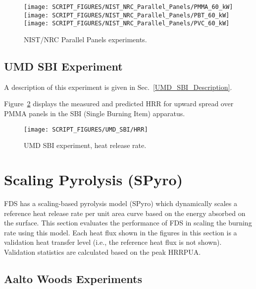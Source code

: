 \begin{figure}[!ht]
\centering
\texttt{[image: SCRIPT\_FIGURES/NIST\_NRC\_Parallel\_Panels/PMMA\_60\_kW]} \\
\texttt{[image: SCRIPT\_FIGURES/NIST\_NRC\_Parallel\_Panels/PBT\_60\_kW]} \\
\texttt{[image: SCRIPT\_FIGURES/NIST\_NRC\_Parallel\_Panels/PVC\_60\_kW]}
\caption[NIST/NRC Parallel Panels experiments]{NIST/NRC Parallel Panels experiments.}
\label{NIST_NRC_PP_HRR}
\end{figure}


\clearpage

\subsection{UMD SBI Experiment}

A description of this experiment is given in Sec.~\ref{UMD_SBI_Description}.

Figure~\ref{UMD_SBI_HRR} displays the measured and predicted HRR for upward spread over PMMA panels in the SBI (Single Burning Item) apparatus.

\begin{figure}[!ht]
\centering
\texttt{[image: SCRIPT\_FIGURES/UMD\_SBI/HRR]}
\caption[UMD SBI experiment, heat release rate]{UMD SBI experiment, heat release rate.}
\label{UMD_SBI_HRR}
\end{figure}

\clearpage

\section{Scaling Pyrolysis (SPyro)}\label{sec_Scaling Pyrolysis}

FDS has a scaling-based pyrolysis model (SPyro) which dynamically scales a reference heat release rate per unit area curve based on the energy absorbed on the surface. This section evaluates the performance of FDS in scaling the burning rate using this model. Each heat flux shown in the figures in this section is a validation heat transfer level (i.e., the reference heat flux is not shown). Validation statistics are calculated based on the peak HRRPUA.

\subsection{Aalto Woods Experiments}\label{sec_Aalto_Woods_Materials}


